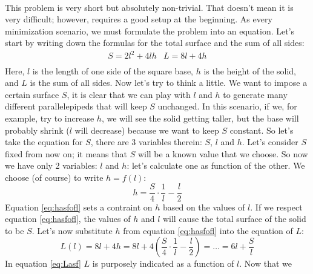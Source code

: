 \paragraph{}
This problem is very short but absolutely non-trivial. That doesn't mean it is
very difficult; however, requires a good setup at the beginning.
As every minimization scenario, we must formulate the problem into an
equation. Let's start by writing down the formulas for the total surface
and the sum of all sides:
\begin{equation*}
    \begin{array}{cc}
        S = 2l^2 + 4lh & L = 8l + 4h \\
    \end{array}
\end{equation*}
Here, $l$ is the length of one side of the square base, $h$ is the height of
the solid, and $L$ is the sum of all sides.
Now let's try to think a little. We want to impose a certain surface $S$,
it is clear that we can play with $l$ and $h$ to generate many different
parallelepipeds that will keep $S$ unchanged. In this scenario, if we, for example,
try to increase $h$, we will see the solid getting taller, but the base will
probably shrink ($l$ will decrease) because we want to keep $S$ constant.
So let's take the equation for $S$, there are 3 variables therein: $S$, $l$ and $h$.
Let's consider $S$ fixed from now on; it means that $S$ will be a known value that we
choose. So now we have only 2 variables: $l$ and $h$: let's calculate one as function of
the other. We choose (of course) to
write $h = f(l)$:
\begin{equation}\label{eq:hasfofl}
    h = \frac{S}{4} \cdot \frac{1}{l} - \frac{l}{2}
\end{equation}
Equation \ref{eq:hasfofl} sets a contraint on $h$ based on the values of $l$. If
we respect equation \ref{eq:hasfofl}, the values of $h$ and $l$ will cause
the total surface of the solid to be $S$.
Let's now substitute $h$ from equation \ref{eq:hasfofl} into the equation of
$L$:
\begin{equation}\label{eq:Lasf}
    L(l) = 8l + 4h = 8l + 4\left( \frac{S}{4} \cdot \frac{1}{l} - \frac{l}{2} \right)
        = \dots = 6l + \frac{S}{l}
\end{equation}
In equation \ref{eq:Lasf} $L$ is purposely indicated as a function of $l$. Now that we
